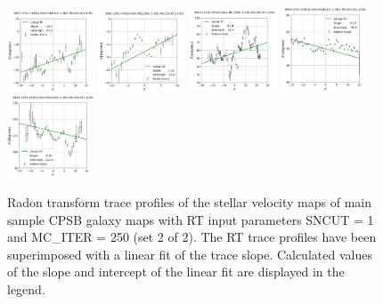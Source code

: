 \documentclass[fleqn,usenatbib]{mnras}
\begin{document}
\begin{figure}
    \includegraphics[width=0.23\textwidth]{Images/LINFITS/CPSB-9047-3701-LINFIT-EBARS-MASKED.png}
    \includegraphics[width=0.23\textwidth]{Images/LINFITS/CPSB-9085-1902-LINFIT-EBARS-MASK.png}
    \includegraphics[width=0.23\textwidth]{Images/LINFITS/CPSB-9493-12705-LINFIT-EBARS-MASKED.png}
    \includegraphics[width=0.23\textwidth]{Images/LINFITS/CPSB-9494-3701-LINFIT-EBARS-MASKED.png}
    \includegraphics[width=0.23\textwidth]{Images/LINFITS/CPSB-9494-3703-LINFIT-EBARS-MASKED.png}
    \caption{Radon transform trace profiles of the stellar velocity maps of main sample CPSB galaxy maps with RT input parameters SNCUT = 1 and MC\_ITER = 250 (set 2 of 2). The RT trace profiles have been superimposed with a linear fit of the trace slope.  Calculated values of the slope and intercept of the linear fit are displayed in the legend.}
    \label{fig:Radon-traces-CPSB-LINFITS-2}
\end{figure}
\end{document}
